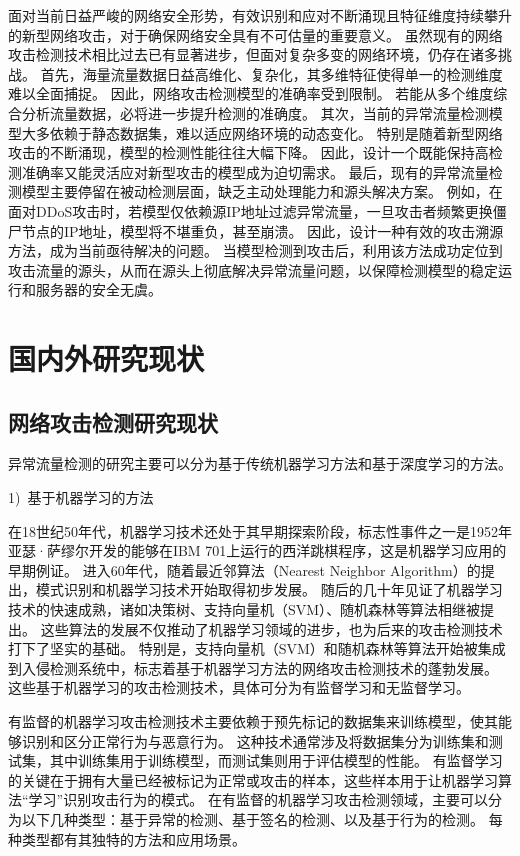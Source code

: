 面对当前日益严峻的网络安全形势，有效识别和应对不断涌现且特征维度持续攀升的新型网络攻击，对于确保网络安全具有不可估量的重要意义。
虽然现有的网络攻击检测技术相比过去已有显著进步，但面对复杂多变的网络环境，仍存在诸多挑战。
首先，海量流量数据日益高维化、复杂化，其多维特征使得单一的检测维度难以全面捕捉。
因此，网络攻击检测模型的准确率受到限制。
若能从多个维度综合分析流量数据，必将进一步提升检测的准确度。
其次，当前的异常流量检测模型大多依赖于静态数据集，难以适应网络环境的动态变化。
特别是随着新型网络攻击的不断涌现，模型的检测性能往往大幅下降。
因此，设计一个既能保持高检测准确率又能灵活应对新型攻击的模型成为迫切需求。
最后，现有的异常流量检测模型主要停留在被动检测层面，缺乏主动处理能力和源头解决方案。
例如，在面对DDoS攻击时，若模型仅依赖源IP地址过滤异常流量，一旦攻击者频繁更换僵尸节点的IP地址，模型将不堪重负，甚至崩溃。
因此，设计一种有效的攻击溯源方法，成为当前亟待解决的问题。
当模型检测到攻击后，利用该方法成功定位到攻击流量的源头，从而在源头上彻底解决异常流量问题，以保障检测模型的稳定运行和服务器的安全无虞。

\section{国内外研究现状}

\subsection{网络攻击检测研究现状}
异常流量检测的研究主要可以分为基于传统机器学习方法和基于深度学习的方法。\par
1)~基于机器学习的方法\par
在18世纪50年代，机器学习技术还处于其早期探索阶段，标志性事件之一是1952年亚瑟·萨缪尔开发的能够在IBM 701上运行的西洋跳棋程序，这是机器学习应用的早期例证。
进入60年代，随着最近邻算法（Nearest Neighbor Algorithm）\cite{taunk2019brief}的提出，模式识别和机器学习技术开始取得初步发展。
随后的几十年见证了机器学习技术的快速成熟，诸如决策树\cite{charbuty2021classification}、支持向量机（SVM）\cite{zhang2021support}、随机森林\cite{athey2019generalized}等算法相继被提出。
这些算法的发展不仅推动了机器学习领域的进步，也为后来的攻击检测技术打下了坚实的基础。
特别是，支持向量机（SVM）和随机森林等算法开始被集成到入侵检测系统中，标志着基于机器学习方法的网络攻击检测技术的蓬勃发展\cite{amaran2021intrusion}。
这些基于机器学习的攻击检测技术，具体可分为有监督学习和无监督学习。



有监督的机器学习攻击检测技术主要依赖于预先标记的数据集来训练模型，使其能够识别和区分正常行为与恶意行为。
这种技术通常涉及将数据集分为训练集和测试集，其中训练集用于训练模型，而测试集则用于评估模型的性能。
有监督学习的关键在于拥有大量已经被标记为正常或攻击的样本，这些样本用于让机器学习算法“学习”识别攻击行为的模式。
在有监督的机器学习攻击检测领域，主要可以分为以下几种类型：基于异常的检测、基于签名的检测、以及基于行为的检测。
每种类型都有其独特的方法和应用场景。


